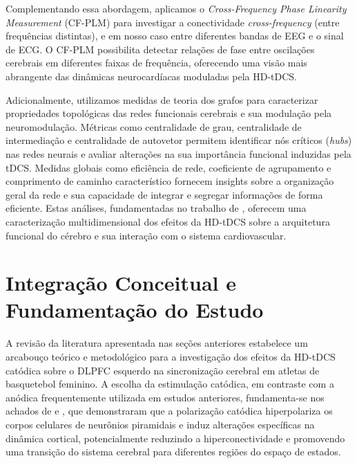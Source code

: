 Complementando essa abordagem, aplicamos o \textit{Cross-Frequency Phase Linearity Measurement} (CF-PLM) para investigar a conectividade \textit{cross-frequency} (entre frequências distintas), e em nosso caso entre diferentes bandas de EEG e o sinal de ECG. O CF-PLM possibilita detectar relações de fase entre oscilações cerebrais em diferentes faixas de frequência, oferecendo uma visão mais abrangente das dinâmicas neurocardíacas moduladas pela HD-tDCS.

Adicionalmente, utilizamos medidas de teoria dos grafos para caracterizar propriedades topológicas das redes funcionais cerebrais e sua modulação pela neuromodulação. Métricas como centralidade de grau, centralidade de intermediação e centralidade de autovetor permitem identificar nós críticos (\textit{hubs}) nas redes neurais e avaliar alterações na sua importância funcional induzidas pela tDCS. Medidas globais como eficiência de rede, coeficiente de agrupamento e comprimento de caminho característico fornecem insights sobre a organização geral da rede e sua capacidade de integrar e segregar informações de forma eficiente. Estas análises, fundamentadas no trabalho de , oferecem uma caracterização multidimensional dos efeitos da HD-tDCS sobre a arquitetura funcional do cérebro e sua interação com o sistema cardiovascular.

\section{Integração Conceitual e Fundamentação do Estudo}
A revisão da literatura apresentada nas seções anteriores estabelece um arcabouço teórico e metodológico para a investigação dos efeitos da HD-tDCS catódica sobre o DLPFC esquerdo na sincronização cerebral em atletas de basquetebol feminino. A escolha da estimulação catódica, em contraste com a anódica frequentemente utilizada em estudos anteriores, fundamenta-se nos achados de  e , que demonstraram que a polarização catódica hiperpolariza os corpos celulares de neurônios piramidais e induz alterações específicas na dinâmica cortical, potencialmente reduzindo a hiperconectividade e promovendo uma transição do sistema cerebral para diferentes regiões do espaço de estados.

